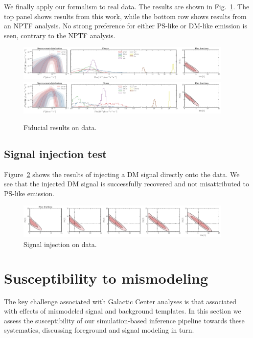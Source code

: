 \documentclass[prd,aps,10pt,nofootinbib,twocolumn,superscriptaddress,preprintnumbers,balancelastpage,longbibliography]{revtex4-1}
\begin{document}
We finally apply our formalism to real \Fermi data. The results are shown in Fig.~\ref{fig:fid_data}. The top panel shows results from this work, while the bottom row shows results from an NPTF analysis. No strong preference for either PS-like or DM-like emission is seen, contrary to the NPTF analysis.

%
\begin{figure}
    \centering
    \includegraphics[width=0.95\textwidth]{plots/data_fid_sbi.pdf}
    \includegraphics[width=0.95\textwidth]{plots/data_fid_nptf.pdf}
    \caption{Fiducial results on data.}
    \label{fig:fid_data}
\end{figure}
%

\subsection{Signal injection test}
\label{sec:sig-injection}

Figure~\ref{fig:sig_inj_data} shows the results of injecting a DM signal directly onto the \Fermi data. We see that the injected DM signal is successfully recovered and not misattributed to PS-like emission.

%
\begin{figure}
    \centering
    \includegraphics[width=0.95\textwidth]{plots/data_sig_inj.pdf}
    \caption{Signal injection on data.}
    \label{fig:sig_inj_data}
\end{figure}
%

\section{Susceptibility to mismodeling}
\label{sec:mismodeling}

The key challenge associated with Galactic Center analyses is that associated with effects of mismodeled signal and background templates. In this section we assess the susceptibility of our simulation-based inference pipeline towards these systematics, discussing foreground and signal modeling in turn. 
\end{document}
